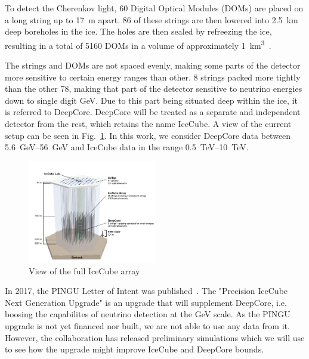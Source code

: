 \documentclass[draft=True]{thesis}
\begin{document}
To detect the Cherenkov light, 60 Digital Optical Modules (DOMs) are placed on a long string up to \SI{17}{\metre} apart. 86 of these strings are then lowered
into \SI{2.5}{\km} deep boreholes in the ice. The holes are then sealed by refreezing the ice, resulting in a total of 5160 DOMs in a volume of approximately \SI{1}{\km^3}~\cite{weaverThesis}.

The strings and DOMs are not spaced evenly, making some parts of the detector more sensitive to certain energy ranges than other.
8 strings packed more tightly than the other 78, making that part of the detector sensitive to neutrino energies down to single digit \si{\GeV}. Due to 
this part being situated deep within the ice, it is referred to DeepCore. DeepCore will be treated as a separate and independent detector from the rest, which
retains the name IceCube. A view of the current setup can be seen in Fig.~\ref{fig:array}. In this work, we consider DeepCore data between \SIrange{5.6}{56}{\GeV} and IceCube data in the range \SIrange{0.5}{10}{\TeV}.
\begin{figure}\label{fig:array}
    \includegraphics[width=0.5\textwidth]{figures/icecube2.png}\caption{View of the full IceCube array}
\end{figure}

In 2017, the PINGU Letter of Intent was published~\cite{PINGUletter}. The "Precision IceCube Next Generation Upgrade" is an upgrade that will 
supplement DeepCore, i.e. boosing the capabilites of neutrino detection at the \si{\GeV} scale. As the PINGU upgrade is not yet financed nor built, we are
not able to use any data from it. However, the collaboration has released preliminary simulations which we will use to see how the upgrade might improve
IceCube and DeepCore bounds. 


\end{document}
